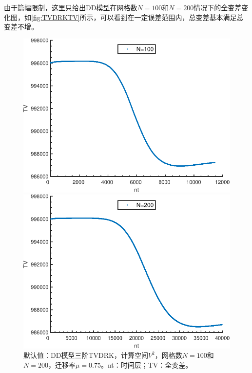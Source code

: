 由于篇幅限制，这里只给出DD模型在网格数$N=100$和$N=200$情况下的全变差变化图，如\autoref{fig:TVDRKTV}所示，可以看到在一定误差范围内，总变差基本满足总变差不增。
\begin{figure}
	\centering
	\begin{minipage}{0.45\linewidth}
		\centering
		\includegraphics[width=\linewidth]{figure/TVDRKN100.pdf}
	\end{minipage}
	\hspace{1cm}
	\begin{minipage}{0.45\linewidth}
		\centering
		\includegraphics[width=\linewidth]{figure/TVDRKN200.pdf}
	\end{minipage}
	\caption{默认值：DD模型三阶TVDRK，计算空间$V^2$，网格数$N=100$和$N=200$，迁移率$\mu=0.75$。nt：时间层；TV：全变差。}
	\label{fig:TVDRKTV}
\end{figure}

